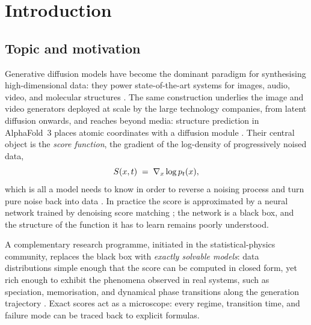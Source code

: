 \chapter{Introduction}\label{ch:intro}

\section{Topic and motivation}

Generative diffusion models have become the dominant paradigm for
synthesising high-dimensional data: they power state-of-the-art systems
for images, audio, video, and molecular structures \citep{sohl2015deep,
ho2020denoising, song2021scorebased, karras2022elucidating}. The same
construction underlies the image and video generators deployed at scale by the
large technology companies, from latent diffusion \citep{rombach2022latent}
onwards, and reaches beyond media: structure prediction in AlphaFold~3 places
atomic coordinates with a diffusion module \citep{abramson2024alphafold3}. Their
central object is the \emph{score function}, the gradient of the
log-density of progressively noised data,
\begin{equation}
  S(x, t) \;=\; \nabla_x \log p_t(x),
  \label{eq:intro-score}
\end{equation}
which is all a model needs to know in order to reverse a noising process
and turn pure noise back into data \citep{anderson1982reverse}. In
practice the score is approximated by a neural network trained by
denoising score matching \citep{hyvarinen2005estimation,
vincent2011connection}; the network is a black box, and the structure of
the function it has to learn remains poorly understood.

A complementary research programme, initiated in the statistical-physics
community, replaces the black box with \emph{exactly solvable models}:
data distributions simple enough that the score can be computed in
closed form, yet rich enough to exhibit the phenomena observed in real
systems, such as speciation, memorisation, and dynamical phase
transitions along the generation trajectory \citep{biroli2023generative,
biroli2024dynamical, raya2023spontaneous, ghio2024sampling,
achilli2026speciation}. Exact scores act as a microscope: every regime,
transition time, and failure mode can be traced back to explicit
formulas.

